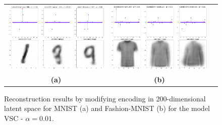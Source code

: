 \begin{figure}[!h]
    \centering
    \captionsetup{justification=centering,margin=1cm}
    \begin{tabular}{ccc}
    \includegraphics[width=.45\textwidth]{figures/latent200_alpha001_ex2} &
    \includegraphics[width=.45\textwidth]{figures/latent200_alpha001_ex4} \\
    \textbf{(a)}  & \textbf{(b)}   \\[6pt]
\end{tabular}
    \centering
    \caption{Reconstruction results by modifying encoding in 200-dimensional latent space for MNIST (a) and Fashion-MNIST (b) for the model VSC - $\alpha = 0.01$.}
    \label{fig:reconstruction}
\end{figure}

